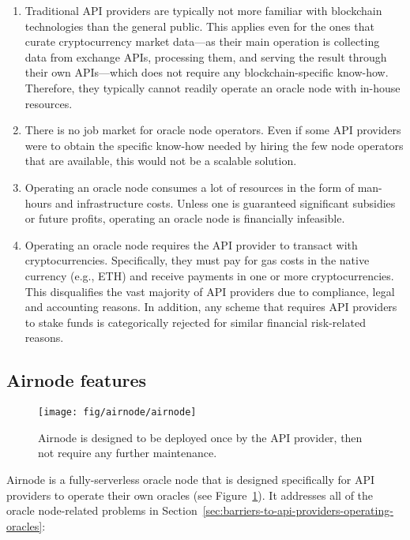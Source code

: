 \documentclass[11pt]{article}
\begin{document}
\begin{enumerate}
    \item Traditional API providers are typically not more familiar with blockchain technologies than the general public.
    This applies even for the ones that curate cryptocurrency market data---as their main operation is collecting data from exchange APIs, processing them, and serving the result through their own APIs---which does not require any blockchain-specific know-how.
    Therefore, they typically cannot readily operate an oracle node with in-house resources.
    \item There is no job market for oracle node operators.
    Even if some API providers were to obtain the specific know-how needed by hiring the few node operators that are available, this would not be a scalable solution.
    \item Operating an oracle node consumes a lot of resources in the form of man-hours and infrastructure costs.
    Unless one is guaranteed significant subsidies or future profits, operating an oracle node is financially infeasible.
    \item Operating an oracle node requires the API provider to transact with cryptocurrencies.
    Specifically, they must pay for gas costs in the native currency (e.g., ETH) and receive payments in one or more cryptocurrencies.
    This disqualifies the vast majority of API providers due to compliance, legal and accounting reasons.
    In addition, any scheme that requires API providers to stake funds is categorically rejected for similar financial risk-related reasons.
\end{enumerate}

\subsection{Airnode features}
\label{sec:airnode-features}

\begin{figure}
    \centering
	\texttt{[image: fig/airnode/airnode]}
	\caption{Airnode is designed to be deployed once by the API provider, then not require any further maintenance.}
	\label{fig:airnode}
\end{figure}

Airnode is a fully-serverless oracle node that is designed specifically for API providers to operate their own oracles (see Figure~\ref{fig:airnode}).
It addresses all of the oracle node-related problems in Section~\ref{sec:barriers-to-api-providers-operating-oracles}:
\end{document}
